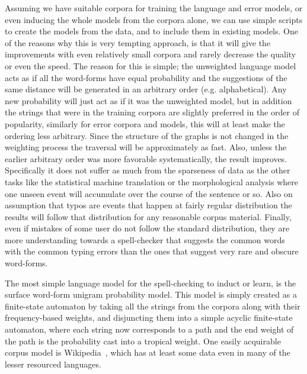 \documentclass[a4paper,12pt]{article}
\begin{document}
Assuming we have suitable corpora for training the language and error models,
or even inducing the whole models from the corpora alone, we can use simple
scripts to create the models from the data, and to include them in existing
models. One of the reasons why this is very tempting approach, is that it will
give the improvements with even relatively small corpora and rarely decrease the
quality or even the speed. The reason for this is simple; the unweighted language
model acts as if all the word-forms have equal probability and the suggestions of
the same distance will be generated in an arbitrary order (e.g. alphabetical). Any new
probability will just act as if it was the unweighted model, but in addition
the strings that were in the training corpora are slightly preferred in the order of
popularity, similarly for error corpora and models, this will at least make the
ordering less arbitrary. Since the structure of the graphs is not changed in
the weighting process the traversal will be approximately as fast. Also,
unless the earlier arbitrary order was more
favorable systematically, the result improves. Specifically it does not suffer
as much from the sparseness of data as the other tasks like the statistical machine
translation or the morphological analysis where one unseen event will accumulate
over the course of the sentence or so. Also on assumption that typos are events
that happen at fairly regular distribution the results will follow that
distribution for any reasonable corpus material. Finally, even if mistakes of
some user do not follow the standard distribution, they are more understanding
towards a spell-checker that suggests the common words with the common typing errors than
the ones that suggest very rare and obscure word-forms.

The most simple language model for the spell-checking to induct or learn, is the
surface word-form unigram probability model. This model is simply created as
a finite-state automaton by taking all the strings from the corpora along with their
frequency-based weights, and disjuncting them into a simple acyclic
finite-state automaton, where each string now corresponds to a path and the end
weight of the path is the probability cast into a tropical weight. One easily
acquirable corpus model is Wikipedia~\cite[]{pirinen/2010/lrec}, which has
at least some data even in many of the lesser resourced languages.
\end{document}
